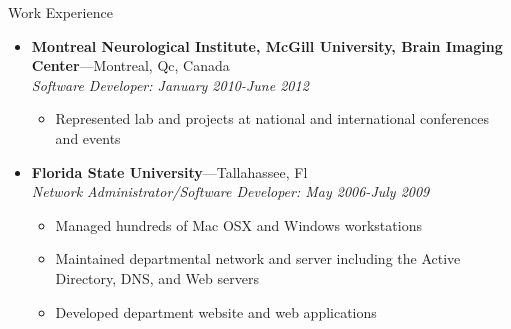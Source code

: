 \documentclass[10pt,oneside]{article}
\newenvironment{ressection}[1]{
  \vspace{4pt}
	 {\fontfamily{phv}\selectfont\Large#1}
	 \begin{itemize}
	   \vspace{3pt}
}{
	 \end{itemize}
}
\newcommand{\ressubitem}[1]{
  \vspace{-1pt}
\item \begin{flushleft} #1 \end{flushleft}
}
\newcommand{\resbigitem}[3]{
  \vspace{-5pt}
\item
  \textbf{#1}---#2 \\
  \textit{#3}
}
\newenvironment{ressubsec}[3]{
  \resbigitem{#1}{#2}{#3}
  \vspace{-2pt}
  \begin{itemize}
}{
  \end{itemize}
}
\begin{document}
\begin{ressection}{Work Experience}
\begin{ressubsec}{Montreal Neurological Institute, McGill University, Brain Imaging Center}{Montreal, Qc, Canada}{Software Developer: January 2010-June 2012}
    \ressubitem {Represented lab and projects at national and international conferences and events}
  \end{ressubsec}
  \begin{ressubsec}{Florida State University}{Tallahassee, Fl}{Network Administrator/Software Developer: May 2006-July 2009}
    \ressubitem{Managed hundreds of Mac OSX and Windows workstations}
    \ressubitem{Maintained departmental network and server including the Active Directory, DNS, and Web servers}
    \ressubitem{Developed department website and web applications}
  \end{ressubsec}
\end{ressection}
\end{document}
